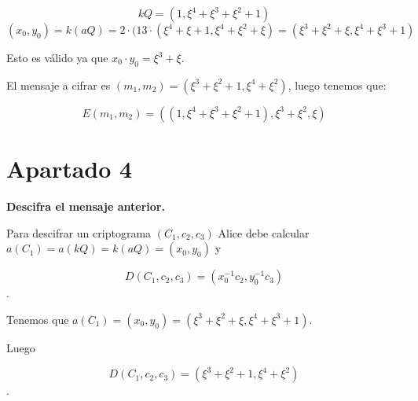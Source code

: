 \documentclass[a4paper]{article}
\begin{document}
$$kQ=(1,\xi^4+\xi^3+\xi^2+1)$$
$$(x_0,y_0)=k(aQ)=2\cdot(13\cdot (\xi^4+\xi+1, \xi^4+\xi^2+\xi)=(\xi^3+\xi^2+\xi, \xi^4+\xi^3+1)$$

Esto es válido ya que $x_0\cdot y_0 = \xi^3+\xi$.

El mensaje a cifrar es $(m_1,m_2)=(\xi^3+\xi^2+1,\xi^4+\xi^2)$, luego tenemos que:

$$E(m_1,m_2)=((1, \xi^4+\xi^3+\xi^2+1), \xi^3+\xi^2, \xi)$$



\section{Apartado 4}

\textbf{Descifra el mensaje anterior.}

Para descifrar un criptograma $(C_1, c_2, c_3)$ Alice debe calcular $a(C_1)=a(kQ)=k(aQ)=(x_0,y_0)$ y

$$D(C_1,c_2,c_3)=(x_0^{-1}c_2, y_0^{-1}c_3)$$.

Tenemos que $a(C_1)=(x_0,y_0)=(\xi^3+\xi^2+\xi, \xi^4+\xi^3+1)$.

Luego

$$D(C_1,c_2,c_3)=(\xi^3+\xi^2+1, \xi^4+\xi^2)$$.
\end{document}
